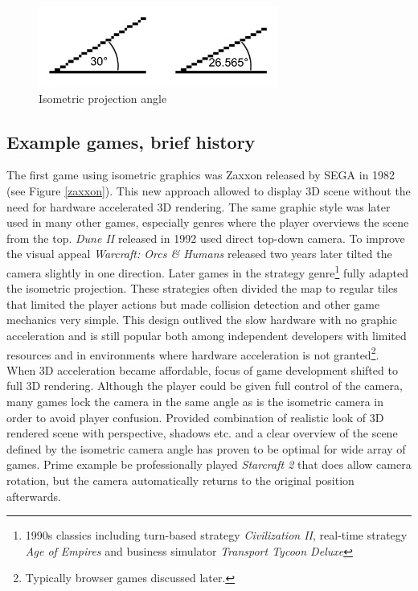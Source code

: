 \documentclass[11pt,oneside, final]{fithesis2}
\begin{document}
\begin{figure}[htp]
	\centering
	\includegraphics[width=0.7\textwidth]{thesis-angles}
	\caption{Isometric projection angle}
	\label{isoangle}
\end{figure}

\subsection{Example games, brief history}
The first game using isometric graphics was Zaxxon released by SEGA in 1982\cite{zaxxon} (see Figure \ref{zaxxon}). This new approach allowed to display 3D scene without the need for hardware accelerated 3D rendering. The same graphic style was later used in many other games, especially genres where the player overviews the scene from the top. \emph{Dune II} released in 1992\cite{dune2} used direct top-down camera. To improve the visual appeal \emph{Warcraft: Orcs \& Humans} released two years later\cite{blizzardlegacy} tilted the camera slightly in one direction. Later games in the strategy genre\footnote{1990s classics including turn-based strategy \emph{Civilization II}\cite{civ2}, real-time strategy \emph{Age of Empires}\cite{ageofempires} and business simulator \emph{Transport Tycoon Deluxe}\cite{ttd}} fully adapted the isometric projection. These strategies often divided the map to regular tiles that limited the player actions but made collision detection and other game mechanics very simple. This design outlived the slow hardware with no graphic acceleration and is still popular both among independent developers with limited resources and in environments where hardware acceleration is not granted\footnote{Typically browser games discussed later.}. When 3D acceleration became affordable, focus of game development shifted to full 3D rendering. Although the player could be given full control of the camera, many games lock the camera in the same angle as is the isometric camera in order to avoid player confusion. Provided combination of realistic look of 3D rendered scene with perspective, shadows etc. and a clear overview of the scene defined by the isometric camera angle has proven to be optimal for wide array of games. Prime example be professionally played \emph{Starcraft 2}\cite{sc2} that does allow camera rotation, but the camera automatically returns to the original position afterwards.
\end{document}
